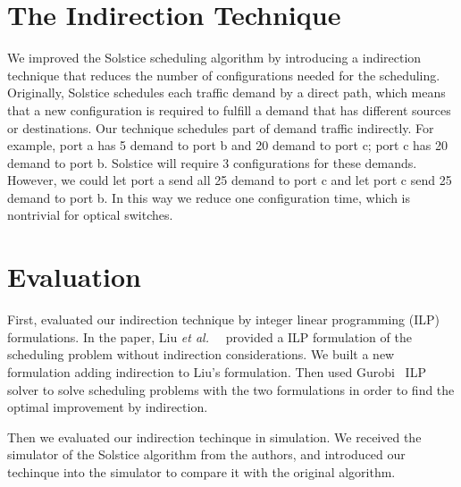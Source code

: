 \section{The Indirection Technique}
\label{sec:indirection}
We improved the Solstice scheduling
algorithm by introducing a indirection technique that reduces the number
of configurations needed for the scheduling. Originally, Solstice
schedules each traffic demand by a direct path, which means that a new
configuration is required to fulfill a demand that has different sources
or destinations. Our technique schedules part of demand traffic
indirectly. For example, port a has 5 demand to port b and 20
demand to port c; port c has 20 demand to port b. Solstice will require
3 configurations for these demands. However, we could let port a send
all 25 demand to port c and let port c send 25 demand to port b. In this
way we reduce one configuration time, which is nontrivial for optical
switches. 

\section{Evaluation}
\label{sec:goal}
First, evaluated our indirection technique by integer
linear programming (ILP) formulations. In the paper, Liu \textit{et al.\ }~\cite{Liu:2015}
provided a ILP formulation of the scheduling problem without indirection
considerations. We built a new formulation adding indirection to Liu's formulation.
Then used Gurobi~\cite{gurobi}
ILP solver to solve scheduling problems with the two formulations in order
to find the optimal improvement by indirection.

Then we evaluated our indirection techinque in simulation. We received the
simulator of the Solstice algorithm from the authors, and introduced
our techinque into the simulator to compare it with the original algorithm.


